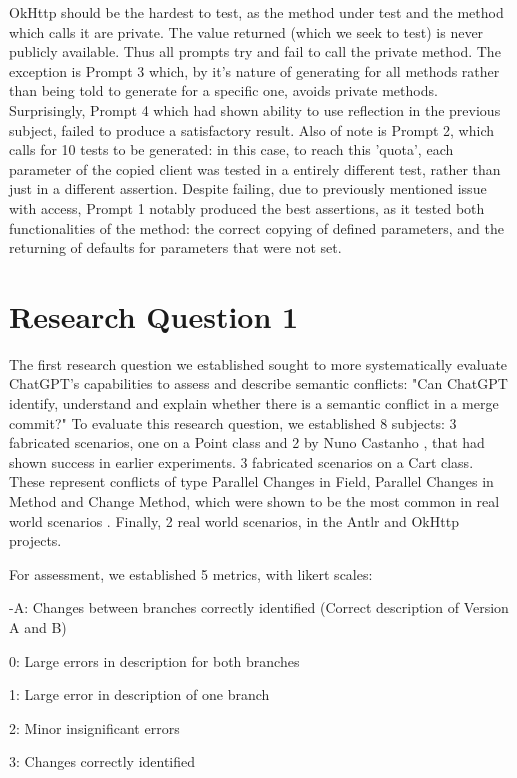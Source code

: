OkHttp should be the hardest to test, as the method under test and the method which calls it are private. The value returned (which we seek to test) is never publicly available.
Thus all prompts try and fail to call the private method. The exception is Prompt 3 which, by it's nature of generating for all methods rather than being told to generate for a specific one, avoids private methods. Surprisingly, Prompt 4 which had shown ability to use reflection in the previous subject, failed to produce a satisfactory result. Also of note is Prompt 2, which calls for 10 tests to be generated: in this case, to reach this 'quota', each parameter of the copied client was tested in a entirely different test, rather than just in a different assertion.
Despite failing, due to previously mentioned issue with access, Prompt 1 notably produced the best assertions, as it tested both functionalities of the method: the correct copying of defined parameters, and the returning of defaults for parameters that were not set.

\section{Research Question 1}

The first research question we established sought to more systematically evaluate ChatGPT's capabilities to assess and describe semantic conflicts: "Can ChatGPT identify, understand and explain whether there is a semantic conflict in a merge commit?"
To evaluate this research question, we established 8 subjects:
3 fabricated scenarios, one on a Point class and 2 by Nuno Castanho \cite{kn:nuno}, that had shown success in earlier experiments.
3 fabricated scenarios on a Cart class. These represent conflicts of type Parallel Changes in Field, Parallel Changes in Method and Change Method, which were shown to be the most common in real world scenarios \cite{kn:nuno}. Finally, 2 real world scenarios, in the Antlr and OkHttp projects.


For assessment, we established 5 metrics, with likert scales:

-A: Changes between branches correctly identified (Correct description of Version A and B)

0: Large errors in description for both branches

1: Large error in description of one branch

2: Minor insignificant errors

3: Changes correctly identified

